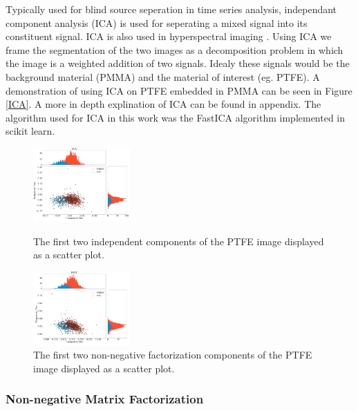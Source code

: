 \documentclass[a4paper,11pt]{article}
\begin{document}
Typically used for blind source seperation in time series analysis, independant component analysis (ICA) is used for seperating a mixed signal into its constituent signal. ICA is also used in hyperspectral imaging \cite{Villa2009OnAnalysis}. Using ICA we frame the segmentation of the two images as a decomposition problem in which the image is a weighted addition of two signals. Idealy these signals would be the background material (PMMA) and the material of interest (eg. PTFE). A demonstration of using ICA on PTFE embedded in PMMA can be seen in Figure \ref{ICA}. A more in depth explination of ICA can be found in appendix. The algorithm used for ICA in this work was the FastICA \cite{Hyvarinen2000IndependentApplications} algorithm implemented in scikit learn.

\begin{figure}
  \begin{center}
    \includegraphics[width=0.33\textwidth]{figures/ICAnone.png}
  \end{center}
  
  \caption{The first two independent components of the PTFE image displayed as a scatter plot.}
  
  \label{ICA}  
  \begin{center}
    \includegraphics[width=0.33\textwidth]{figures/NMFnone.png}
  \end{center}
  
  \caption{The first two non-negative factorization components of the PTFE image displayed as a scatter plot.}
  
  \label{NMF}
\end{figure}

\subsubsection{Non-negative Matrix Factorization}
\end{document}
